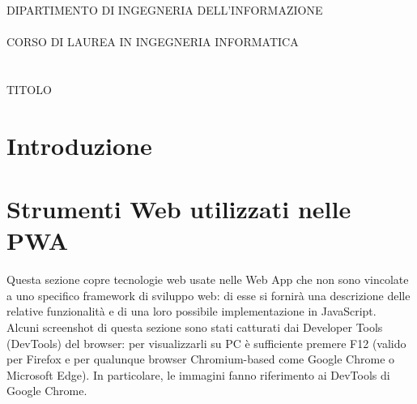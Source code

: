 \documentclass[a4paper, 12pt, twoside, openright]{book}
\newenvironment{abstract}{\cleardoublepage \null \vfill \begin{center}\bfseries\abstractname \end{center}}{\vfill\null}
\begin{document}
\frontmatter
\begin{titlepage}
	\begin{flushleft}
		
		\begin{minipage}[b][1,8 cm][c]{0.3\columnwidth}
			\textsf{{\color{Sepia}{DIPARTIMENTO\\DI INGEGNERIA\\DELL'INFORMAZIONE}}}
		\end{minipage}
	\end{flushleft}
	
	\vfill
	\begin{center}
		\begin{large}
			DIPARTIMENTO DI INGEGNERIA DELL'INFORMAZIONE
			\\~\\
			CORSO DI LAUREA IN INGEGNERIA INFORMATICA
			\\~\\~\\
			TITOLO
		\end{large}
	\end{center}
\end{titlepage}
\cleardoublepage %

\begingroup %
  \makeatletter
  \let\ps@plain\ps@empty
  \makeatother
  \tableofcontents
  \clearpage
\endgroup


\begin{abstract} %
\markboth{}{} %
\thispagestyle{empty}
\end{abstract}


\mainmatter\doublespace 

\chapter*{Introduzione} %
\thispagestyle{empty}

\chapter{Strumenti Web utilizzati nelle PWA}
Questa sezione copre tecnologie web usate nelle Web App che non sono vincolate a uno specifico framework di sviluppo web: di esse si fornirà una descrizione delle relative funzionalità e di una loro possibile implementazione in JavaScript.\\ %
Alcuni screenshot di questa sezione sono stati catturati dai Developer Tools (DevTools) del browser: per visualizzarli su PC è sufficiente premere F12 (valido per Firefox e per qualunque browser Chromium-based come Google Chrome o Microsoft Edge). In particolare, le immagini fanno riferimento ai DevTools di Google Chrome.
\end{document}
